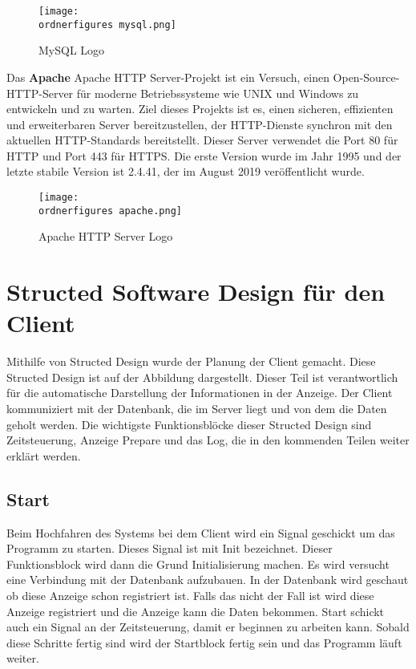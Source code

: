 \begin{figure}[H]
	\centering
	\texttt{[image: \\ordnerfigures mysql.png]}
	\caption{MySQL Logo\cite{40_mysql_img}}
	\label{fi:mysql}
\end{figure}

Das \textbf{Apache} Apache HTTP Server-Projekt ist ein Versuch, einen Open-Source-HTTP-Server f\"{u}r moderne Betriebssysteme wie UNIX und Windows zu entwickeln und zu warten. Ziel dieses Projekts ist es, einen sicheren, effizienten und erweiterbaren Server bereitzustellen, der HTTP-Dienste synchron mit den aktuellen HTTP-Standards bereitstellt. Dieser Server verwendet die Port 80 f\"{u}r HTTP und Port 443 f\"{u}r HTTPS. Die erste Version wurde im Jahr 1995 und der letzte stabile Version ist 2.4.41, der im August 2019 ver\"{o}ffentlicht wurde.\cite{40_apache}



\begin{figure}[H]
	\centering
	\texttt{[image: \\ordnerfigures apache.png]}
	\caption{Apache HTTP Server Logo\cite{40_apache_img}}
	\label{fi:apache}
\end{figure}


\section{Structed Software Design für den Client}

Mithilfe von Structed Design wurde der Planung der Client gemacht. Diese Structed Design ist auf der Abbildung \cite{fi:structed_design_client} dargestellt. 
Dieser Teil ist verantwortlich f\"{u}r die automatische Darstellung der Informationen in der Anzeige. Der Client kommuniziert mit der Datenbank, die im Server liegt und von dem die Daten geholt werden. Die wichtigste Funktionsbl\"{o}cke dieser Structed Design sind Zeitsteuerung, Anzeige Prepare und das Log, die in den kommenden Teilen weiter erkl\"{a}rt werden.

\subsection{Start}
Beim Hochfahren des Systems bei dem Client wird ein Signal geschickt um das Programm zu starten. Dieses Signal ist mit Init bezeichnet. Dieser Funktionsblock wird dann die Grund Initialisierung machen. Es wird versucht eine Verbindung mit der Datenbank aufzubauen. In der Datenbank wird geschaut ob diese Anzeige schon registriert ist. Falls das nicht der Fall ist wird diese Anzeige registriert und die Anzeige kann die Daten bekommen. Start schickt auch ein Signal an der Zeitsteuerung, damit er beginnen zu arbeiten kann. Sobald diese Schritte fertig sind wird der Startblock fertig sein und das Programm l\"{a}uft weiter.

